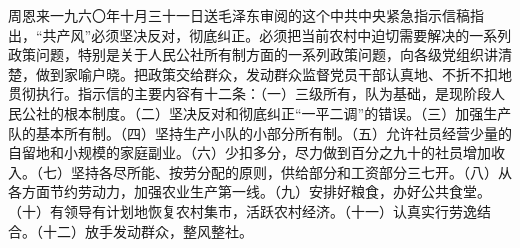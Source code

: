 \begin{maonote}
周恩来一九六〇年十月三十一日送毛泽东审阅的这个中共中央紧急指示信稿指出，“共产风”必须坚决反对，彻底纠正。必须把当前农村中迫切需要解决的一系列政策问题，特别是关于人民公社所有制方面的一系列政策问题，向各级党组织讲清楚，做到家喻户晓。把政策交给群众，发动群众监督党员干部认真地、不折不扣地贯彻执行。指示信的主要内容有十二条：（一）三级所有，队为基础，是现阶段人民公社的根本制度。（二）坚决反对和彻底纠正“一平二调”的错误。（三）加强生产队的基本所有制。（四）坚持生产小队的小部分所有制。（五）允许社员经营少量的自留地和小规模的家庭副业。（六）少扣多分，尽力做到百分之九十的社员增加收入。（七）坚持各尽所能、按劳分配的原则，供给部分和工资部分三七开。（八）从各方面节约劳动力，加强农业生产第一线。（九）安排好粮食，办好公共食堂。（十）有领导有计划地恢复农村集市，活跃农村经济。（十一）认真实行劳逸结合。（十二）放手发动群众，整风整社。
\end{maonote}
